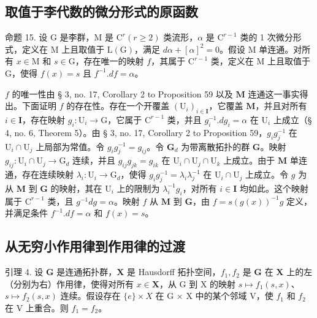 \subsection{取值于李代数的微分形式的原函数}

命题 15. 设 \(\mathrm{G}\) 是李群，\(\mathrm{M}\) 是 \(\mathrm{C}^r (r\geqslant 2)\) 类流形，\(\alpha\) 是 \(\mathrm{C}^{r - 1}\) 类的 1 次微分形式，定义在 \(\mathrm{M}\) 上且取值于 \(\mathrm{L}(\mathrm{G})\)，满足 \(d\alpha +[\alpha ]^2 = 0\)。假设 \(\mathrm{M}\) 单连通。对所有 \(x\in \mathrm{M}\) 和 \(s\in \mathrm{G}\)，存在唯一的映射 \(f\)，其属于 \(\mathrm{C}^{r - 1}\) 类，定义在 \(\mathrm{M}\) 上且取值于 \(\mathrm{G}\)，使得 \(f(x) = s\) 且 \(f^{-1}.df = \alpha\)。

\(f\) 的唯一性由 § 3, no. 17, Corollary 2 to Proposition 59 以及 \(\mathbf{M}\) 连通这一事实得出。下面证明 \(f\) 的存在性。存在一个开覆盖 \((\mathrm{U}_i)_{i\in \mathbf{I}}\)，它覆盖 \(\mathbf{M}\)，并且对所有 \(i\in \mathbf{I}\)，存在映射 \(g_i: \mathrm{U}_i\to \mathrm{G}\)，它属于 \(\mathrm{C}^{r - 1}\) 类，并且 \(g_i^{-1}.d g_i = \alpha\) 在 \(\mathrm{U}_i\) 上成立（§ 4, no. 6, Theorem 5）。由 § 3, no. 17, Corollary 2 to Proposition 59，\(g_i g_j^{-1}\) 在 \(\mathrm{U}_i\cap \mathrm{U}_j\) 上局部为常值。令 \(g_i g_j^{-1} = g_{ij}\)。令 \(\mathbf{G}_d\) 为带离散拓扑的群 \(\mathbf{G}\)。映射 \(g_{ij}: \mathrm{U}_i\cap \mathrm{U}_j\to \mathrm{G}_d\) 连续，并且 \(g_{ij}g_{jk} = g_{ik}\) 在 \(\mathrm{U}_i\cap \mathrm{U}_j\cap \mathrm{U}_k\) 上成立。由于 \(\mathbf{M}\) 单连通，存在连续映射 \(\lambda_i: \mathrm{U}_i\to \mathrm{G}_d\)，使得 \(g_i g_j^{-1} = \lambda_i\lambda_j^{-1}\) 在 \(\mathrm{U}_i\cap \mathrm{U}_j\) 上成立。令 \(g\) 为从 \(\mathbf{M}\) 到 \(\mathbf{G}\) 的映射，其在 \(\mathrm{U}_i\) 上的限制为 \(\lambda_i^{-1}g_i\)，对所有 \(i\in \mathbf{I}\) 均如此。这个映射属于 \(\mathrm{C}^{r - 1}\) 类，且 \(g^{-1}d g = \alpha\)。映射 \(f\) 从 \(\mathbf{M}\) 到 \(\mathbf{G}\)，由 \(f = s(g(x))^{-1}g\) 定义，并满足条件 \(f^{-1}.df = \alpha\) 和 \(f(x) = s\)。

\subsection{从无穷小作用律到作用律的过渡}

引理 4. 设 \(\mathbf{G}\) 是连通拓扑群，\(\mathbf{X}\) 是 Hausdorff 拓扑空间，\(f_{1}, f_{2}\) 是 \(\mathbf{G}\) 在 \(\mathbf{X}\) 上的左（分别为右）作用律，使得对所有 \(x \in \mathbf{X}\)，从 G 到 X 的映射 \(s \mapsto f_1(s, x)\)、\(s \mapsto f_2(s, x)\) 连续。假设存在 \(\{e\} \times X\) 在 G \(\times\) X 中的某个邻域 V，使 \(f_1\) 和 \(f_2\) 在 V 上重合。则 \(f_1 = f_2\)。

